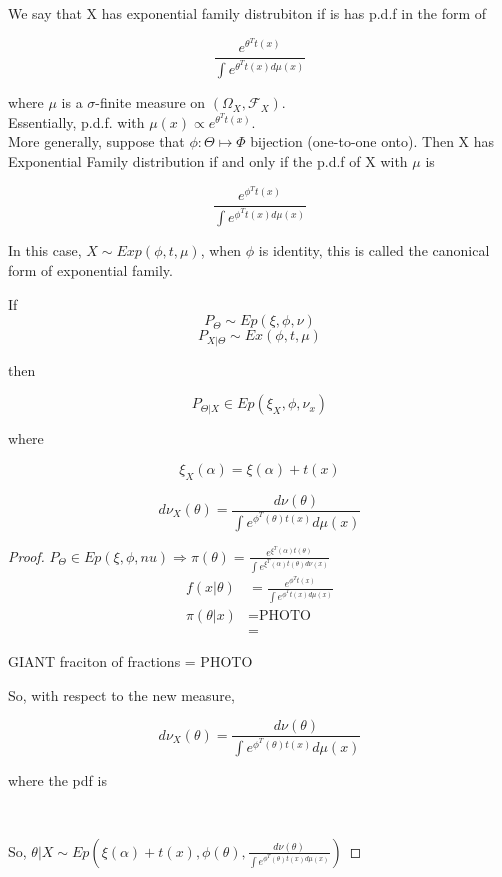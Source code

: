 \documentclass[11pt,fleqn]{book} %
\begin{document}
We say that X has exponential family distrubiton if is has p.d.f in the form of 

		$$\frac{e^{\theta^T t(x)}}{\int e^{\theta^T t(x) d\mu(x)}} $$

where $\mu$ is a $\sigma$-finite measure on $(\Omega_X, \mathcal{F}_X)$. \\

Essentially, p.d.f. with $\mu(x) \propto e^{\theta^T t(x)}$.\\

More generally, suppose that $\phi: \Theta \mapsto \Phi$ bijection (one-to-one onto). Then X has Exponential Family distribution if and only if the p.d.f of X with $\mu$ is 

		$$ \frac{e^{\phi^T t(x)}}{\int e^{\phi^T t(x) d\mu(x)}}$$

In this case, $X \sim Exp(\phi, t, \mu)$, when $\phi$ is identity, this is called the canonical form of exponential family. \\

\begin{theorem}
	If 
		$$P_\Theta \sim Ep(\xi, \phi, \nu )$$
		$$P_{X|\Theta} \sim Ex(\phi, t, \mu)$$

	then 

			$$P_{\Theta|X} \in Ep(\xi_X, \phi, \nu_x) $$

	where

			$$\xi_X(\alpha) = \xi(\alpha) + t(x)$$

			$$d\nu_X(\theta) = \frac{d \nu(\theta)}{\int e^{\phi^T(\theta) t(x)} d\mu(x)} $$
\end{theorem}

\begin{proof}
	$P_\Theta \in Ep(\xi, \phi, nu) \Rightarrow \pi(\theta) = \frac{e^{\xi^T(\alpha) t(\theta)}}{\int e^{\xi^T(\alpha) t(\theta) d\nu(x)}}$\\

	\begin{align*}
		f(x|\theta) &= \frac{e^{\phi^T t(x)}}{\int e^{\phi^T t(x) d\mu(x)}}\\
		\pi(\theta|x) &= \text{PHOTO}\\
				&=  
	\end{align*}

GIANT fraciton of fractions = PHOTO

So, with respect to the new measure, 
	
	$$d\nu_X(\theta) = \frac{d\nu(\theta)}{\int e^{\phi^T(\theta) t(x)}d\mu(x)} $$

where the pdf is 

		$$\frac{}{} $$

So, $\theta|X \sim Ep(\xi(\alpha) + t(x), \phi(\theta), \frac{d\nu(\theta)}{\int e^{\phi^T (\theta) t(x) d\mu(x)}})$

\end{proof}
\end{document}
